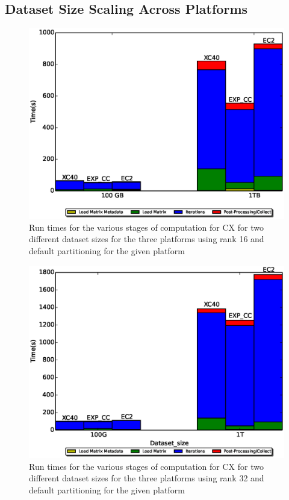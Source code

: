   \subsection{Dataset Size Scaling Across Platforms}
    
    \begin{figure} [H]
    \begin{centering}
    \includegraphics[scale=0.4]{images/CX_Size_Scaling_Rank_16_Partitions_default.eps}
    \end{centering}
    \caption{ Run times for the various stages of computation for CX for two different dataset sizes for the three platforms using rank 16 and default partitioning for the given platform} 
    \end{figure}

      \begin{figure} [H]
    \begin{centering}
    \includegraphics[scale=0.4]{images/CX_Size_Scaling_Rank_32_Partitions_default.eps}
    \end{centering}
    \caption{ Run times for the various stages of computation for CX for two different dataset sizes for the three platforms using rank 32 and default partitioning for the given platform} 
    \end{figure}
  

